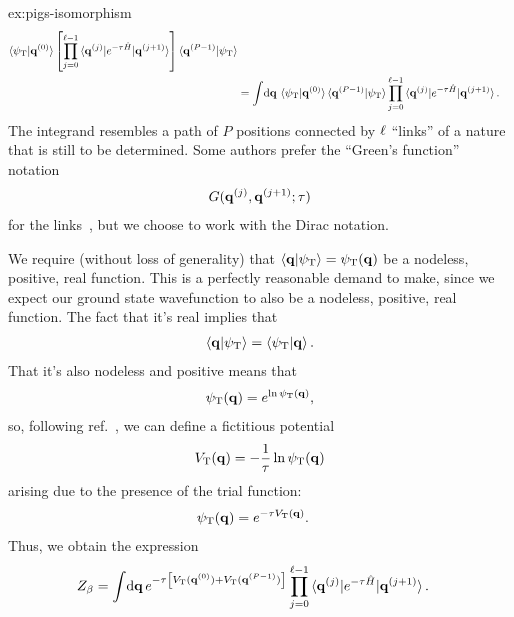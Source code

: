 \begin{DefAnswer}{ex:pigs-isomorphism}
\begin{subequations}
\begin{align}
			\braket{\psiT | \vec{q}\bead{0}}
			\left[ \prod_{j=0}^{\links - 1}
				\braket{\vec{q}\bead{j} | e^{-\tau \hat{H}} | \vec{q}\bead{j+1}}
			\right]
			\braket{\vec{q}\bead{P-1} | \psiT} \\
		&= \int\! \dif \vec{q} \,
			\braket{\psiT | \vec{q}\bead{0}}
			\braket{\vec{q}\bead{P-1} | \psiT}
			\prod_{j=0}^{\links - 1}
				\braket{\vec{q}\bead{j} | e^{-\tau \hat{H}} | \vec{q}\bead{j+1}}.
	\end{align}
	\end{subequations}
	The integrand resembles a path of $P$ positions connected by $\ell$ ``links'' of a nature that is still to be determined.
	Some authors prefer the ``Green's function'' notation
	\begin{align}
		G(\bm{\mathbf{q}}^{(j)}, \bm{\mathbf{q}}^{(j+1)}; \tau)
	\end{align}
	for the links~\cite{sarsa2000pigs}, but we choose to work with the Dirac notation.

	We require (without loss of generality) that $\braket{\bm{\mathbf{q}} | \psi_\mathrm{T}} = \psi_\mathrm{T}(\bm{\mathbf{q}})$ be a nodeless, positive, real function.
	This is a perfectly reasonable demand to make, since we expect our ground state wavefunction to also be a nodeless, positive, real function.
	The fact that it's real implies that
	\begin{align}
		\braket{\bm{\mathbf{q}} | \psi_\mathrm{T}} = \braket{\psi_\mathrm{T} | \bm{\mathbf{q}}}.
	\end{align}
	That it's also nodeless and positive means that
	\begin{align}
		\psi_\mathrm{T}(\bm{\mathbf{q}}) = e^{\ln{\psi_\mathrm{T}(\bm{\mathbf{q}})}},
	\end{align}
	so, following ref.~\cite{schmidt2014inclusion}, we can define a fictitious potential
	\begin{align}
		V_\mathrm{T}(\bm{\mathbf{q}}) = -\frac{1}{\tau} \ln{\psi_\mathrm{T}(\bm{\mathbf{q}})}
	\end{align}
	arising due to the presence of the trial function:
	\begin{align}
		\psi_\mathrm{T}(\bm{\mathbf{q}})
		&= e^{-\tau V_\mathrm{T}(\bm{\mathbf{q}})}.
	\end{align}
	Thus, we obtain the expression
	\begin{align}
		Z_\beta
		&= \int\! \dif \vec{q} \,
			e^{-\tau \left[ \VT(\vec{q}\bead{0}) + \VT(\vec{q}\bead{P-1}) \right]}
			\prod_{j=0}^{\links - 1}
				\braket{\vec{q}\bead{j} | e^{-\tau \hat{H}} | \vec{q}\bead{j+1}}.
	\end{align}


\end{DefAnswer}
